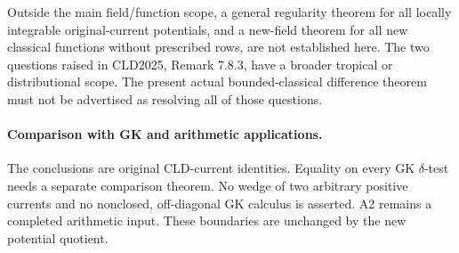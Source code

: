 \documentclass[11pt,a4paper]{article}
\numberwithin{equation}{section}
\theoremstyle{definition}
\theoremstyle{remark}
\begin{document}
Outside the main field/function scope, a general regularity theorem
for all locally integrable original-current potentials, and a
new-field theorem for all new classical functions without
prescribed rows, are not established here. The two questions
raised in CLD2025, Remark 7.8.3, have a broader tropical or
distributional scope. The present actual bounded-classical
difference theorem must not be advertised as resolving all of
those questions.

\paragraph{Comparison with GK and arithmetic applications.}
The conclusions are original CLD-current identities. Equality
on every GK $\delta$-test needs a separate comparison theorem.
No wedge of two arbitrary positive currents and no nonclosed,
off-diagonal GK calculus is asserted. A2 remains a completed
arithmetic input. These boundaries are unchanged by the new
potential quotient.



\clearpage
\end{document}

